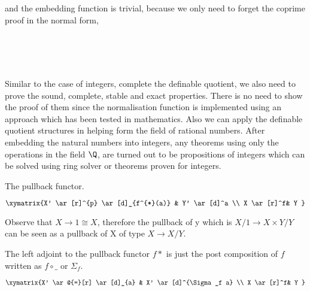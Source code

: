 and the embedding function is trivial, because we only need to forget
the coprime proof in the normal form,

\begin{code}
\\
\> \AgdaSymbol{:}   \<%
\\
\>   \AgdaSymbol{=} \AgdaSymbol{(} \AgdaSymbol{(} \AgdaSymbol{))}  \AgdaSymbol{(} \AgdaSymbol{)}\<%
\\
\end{code}

Similar to the case of integers, complete the definable quotient, we
also need to prove the sound, complete, stable and exact
properties. There is no need to show the proof of them since the
normalisation function is implemented using an approach which has been
tested in mathematics.
Also we can apply the definable quotient structures in helping form
the field of rational numbers. After embedding the natural numbers
into integers, any theorems using only the operations in the field
$\Q$, are turned out to be propositions of integers which can be
solved using ring solver or theorems proven for integers.





The pullback functor.

\begin{displaymath}
    \xymatrix{X' \ar[r]^{p} \ar[d]_{f^{*}(a)} & Y' \ar[d]^a \\
      X \ar[r]^f& Y }
\end{displaymath}


Observe that $X \rightarrow 1 \cong X$, therefore the pullback of y which is
$X/1 \rightarrow X \times Y / Y$ can be seen as a pullback of X of type $X \rightarrow
X/Y$.

The left adjoint to the pullback functor $f*$ is just the post
composition of $f$ written as $f \circ\_$ or $\Sigma_f$.

\begin{displaymath}
    \xymatrix{X' \ar@{=}[r] \ar[d]_{a} & X' \ar[d]^{\Sigma_f a} \\
      X \ar[r]^f& Y }
\end{displaymath}





